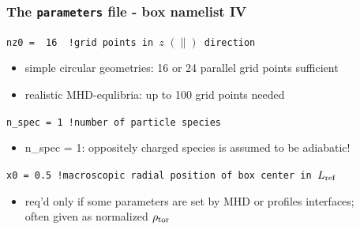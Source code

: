\documentclass[10pt]{beamer}
\begin{document}
\begin{frame}[fragile]
  \frametitle{The {\tt parameters} file - box namelist IV}
\begin{block}%

\begin{block}

\verb|nz0 =  16  !grid points in |$z\,\,(\parallel)$\verb| direction|
\end{block}
\begin{itemize}
\item simple circular geometries: 16 or 24 parallel grid points sufficient
\item realistic MHD-equlibria: up to 100 grid points needed
\end{itemize}
\begin{block}

\verb|n_spec = 1 !number of particle species|
\end{block}
\begin{itemize}
\item n\_spec = 1: oppositely charged species is assumed to be adiabatic!
\end{itemize}
\begin{block}

\verb|x0 = 0.5 !macroscopic radial position of box center in |$L_{\rm ref}$
\end{block}
\begin{itemize}
\item req'd only if some parameters are set by MHD or profiles interfaces;\\
often given as normalized $\rho_{\rm tor}$
\end{itemize}

\end{block}
\end{frame}


\end{document}
